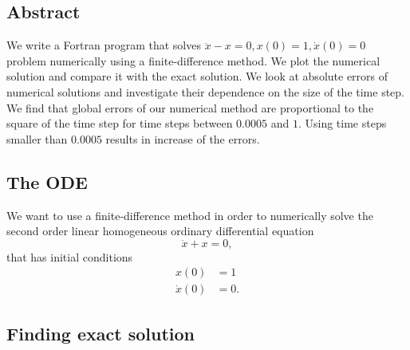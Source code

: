 \subsection{Abstract}

We write a Fortran program that solves $\ddot{x} - x = 0, x(0)=1, \dot{x}(0)=0$ problem numerically using a finite-difference method. We plot the numerical solution and compare it with the exact solution. We look at absolute errors of numerical solutions and investigate their dependence on the size of the time step. We find that global errors of our numerical method are proportional to the square of the time step for time steps between $0.0005$ and $1$. Using time steps smaller than $0.0005$ results in increase of the errors.

\subsection{The ODE}

We want to use a finite-difference method in order to numerically solve the second order linear homogeneous ordinary differential equation
\begin{equation}
  \ddot{x} + x = 0,
  \label{eq_ode}
\end{equation}
that has initial conditions
\begin{align}
  x(0) &= 1 \label{eq_ode_condition_one} \\
  \dot{x}(0) &= 0. \label{eq_ode_condition_two}
\end{align}



\subsection{Finding exact solution}


